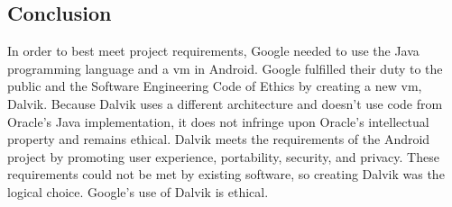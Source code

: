 \documentclass[11pt]{article}
\begin{document}
\begin{multicols}{2}



\section{Conclusion} %
\label{sec:conclusion}

In order to best meet project requirements, Google needed to use the Java
programming language and a \gls{vm} in Android.  Google fulfilled their duty to
the public and the Software Engineering Code of Ethics by creating a new
\gls{vm}, Dalvik.  Because Dalvik uses a different architecture and doesn't use
code from Oracle's Java implementation, it does not infringe upon Oracle's
intellectual property and remains ethical.  Dalvik meets the requirements of the
Android project by promoting user experience, portability, security, and
privacy.  These requirements could not be met by existing software, so creating
Dalvik was the logical choice.  Google's use of Dalvik is ethical.


\appendix

\printglossaries

\end{multicols}
\newpage


{}
\nocite{*}


\end{document}

